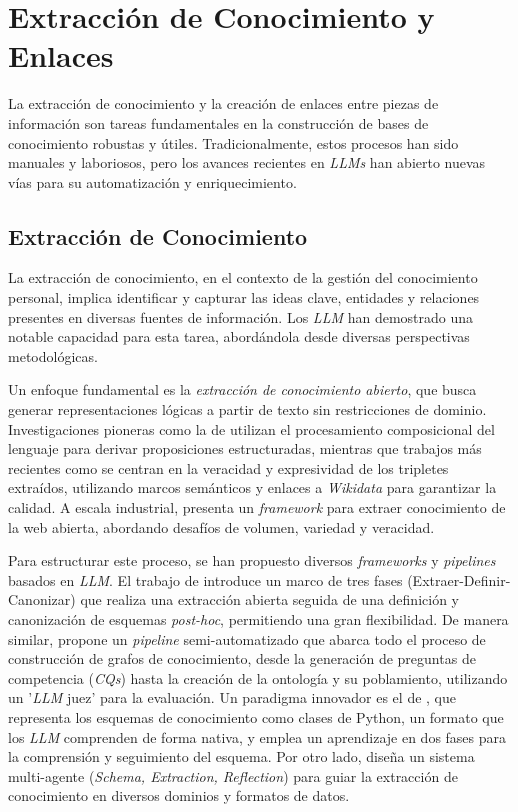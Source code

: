 \section{Extracción de Conocimiento y Enlaces}
\label{sec:extraccion_conocimiento_enlaces}
La extracción de conocimiento y la creación de enlaces entre piezas de información son tareas fundamentales en la construcción de bases de conocimiento robustas y útiles. Tradicionalmente, estos procesos han sido manuales y laboriosos, pero los avances recientes en \textit{LLMs} han abierto nuevas vías para su automatización y enriquecimiento.

\subsection{Extracción de Conocimiento}
La extracción de conocimiento, en el contexto de la gestión del conocimiento personal, implica identificar y capturar las ideas clave, entidades y relaciones presentes en diversas fuentes de información. Los \textit{LLM} han demostrado una notable capacidad para esta tarea, abordándola desde diversas perspectivas metodológicas.

Un enfoque fundamental es la \textit{extracción de conocimiento abierto}, que busca generar representaciones lógicas a partir de texto sin restricciones de dominio. Investigaciones pioneras como la de \parencite{vandurmeOpenKnowledgeExtraction2008} utilizan el procesamiento composicional del lenguaje para derivar proposiciones estructuradas, mientras que trabajos más recientes como \parencite{songOpenFactFactualityEnhanced2023} se centran en la veracidad y expresividad de los tripletes extraídos, utilizando marcos semánticos y enlaces a \textit{Wikidata} para garantizar la calidad. A escala industrial, \parencite{qianOpenDomainKnowledge2023} presenta un \textit{framework} para extraer conocimiento de la web abierta, abordando desafíos de volumen, variedad y veracidad.

Para estructurar este proceso, se han propuesto diversos \textit{frameworks} y \textit{pipelines} basados en \textit{LLM}. El trabajo de \parencite{zhangExtractDefineCanonicalize2024} introduce un marco de tres fases (Extraer-Definir-Canonizar) que realiza una extracción abierta seguida de una definición y canonización de esquemas \textit{post-hoc}, permitiendo una gran flexibilidad. De manera similar, \parencite{kommineniHumanExpertsMachines2024} propone un \textit{pipeline} semi-automatizado que abarca todo el proceso de construcción de grafos de conocimiento, desde la generación de preguntas de competencia (\textit{CQs}) hasta la creación de la ontología y su poblamiento, utilizando un '\textit{LLM} juez' para la evaluación. Un paradigma innovador es el de \parencite{liKnowCoderCodingStructured2024}, que representa los esquemas de conocimiento como clases de Python, un formato que los \textit{LLM} comprenden de forma nativa, y emplea un aprendizaje en dos fases para la comprensión y seguimiento del esquema. Por otro lado, \parencite{luoOneKEDockerizedSchemaGuided2025} diseña un sistema multi-agente (\textit{Schema, Extraction, Reflection}) para guiar la extracción de conocimiento en diversos dominios y formatos de datos.

